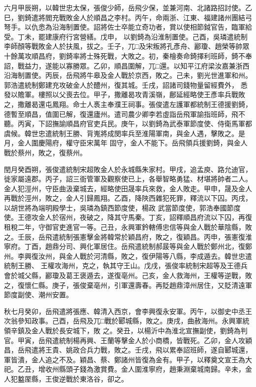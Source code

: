 \begin{pinyinscope}
 六月甲辰朔，以韓世忠太保，張俊少師，岳飛少保，並兼河南、北諸路招討使。乙巳，劉錡遣將閻充戰敗金人於順昌之李村。丙午，命兩浙、江東、福建諸州團結弓弩手。以仇悆為沿海制置使。詔將佐士卒能立奇功者，賞以使相節鉞官告，臨軍給受。丁未，罷建康府行宮營繕。戊申，
 以劉錡為沿淮制置使。己酉，吳璘遣統制李師顏等戰敗金人於扶風，拔之。壬子，兀□及宋叛將孔彥舟、酈瓊、趙榮等帥眾十餘萬攻順昌府，劉錡率將士殊死戰，大敗之。初，秦檜奏命錡擇利班師，錡不奉詔，戰益力，遂能以寡勝眾。乙卯，順昌圍解，兀□還。以知平江府梁汝嘉兼浙西沿海制置使。丙辰，岳飛將牛皋及金人戰於京西，敗之。己未，劉光世進軍和州。郭浩遣統制鄭建充攻破金人於醴州，復其城。壬戌，詔諸司錢物量留經費外，
 悉發以贍軍。樓照以父喪去位。甲子，撒離曷攻青溪嶺，鄜延經略使王彥率兵戰敗之，撒離曷還屯鳳翔。命士人褭主奉濮王祠事。張俊遣左護軍都統制王德援劉錡，德暫至順昌，值圍已解，復還廬州。遣司農少卿李若虛詣岳飛軍諭指班師，飛不聽。丙寅，下詔撫諭順昌府官吏兵民。庚午，以劉錡為武泰軍節度使、侍衛馬軍都虞候。韓世忠遣統制王勝、背嵬將成閔率兵至淮陽軍南，與金人遇，擊敗之。是月，金人圍慶陽府，權守臣宋萬年
 固守，金人不能下。岳飛領兵援劉錡，與金人戰於蔡州，敗之，復蔡州。



 閏月癸酉朔，張俊遣統制宋超敗金人於永城縣朱家村。甲戌，追孟庾、路允迪官，徙家屬遠郡。丙子，詔三衙管軍及觀察使已上，各舉智略勇猛、材堪將帥者二人。金人犯涇州，守臣曲汲棄城去，經略使田晟率兵來救，金人敗走。甲申，晟及金人再戰於涇州，敗之，金人引歸鳳翔。乙酉，降陜西雜犯死罪，釋流以下囚。丙戌，以胡世將為端明殿學士，吳璘為鎮西節度使，楊政
 武當節度使，郭浩奉國節度使。王德攻金人於宿州，夜破之，降其守馬秦。丁亥，詔釋順昌府流以下囚，再復租稅二年，守御官吏進官一等。己丑，永興軍鈐轄傅忠信等與金人戰於華陰縣，敗之。壬辰，岳飛遣統制張憲擊金將韓常於穎昌府，敗之，復穎昌。丙申，張憲復淮寧府。丁酉，趙鼎分司、興化軍居住。岳飛遣統制郝晸等與金人戰於鄭州北，復鄭州。李興復汝州，與金人戰於河清縣，敗之，復伊陽等八縣，李成遁去。韓世忠遣統制王勝、
 王權攻海州，克之，執其守王山。戊戌，張俊率統制宋超等及王德兵會於城父縣，酈瓊及葛王褒遁去，遂復亳州。己亥，金人救海州，王權等逆戰，敗之，復懷仁縣。庚子，張俊棄亳州，引軍還壽春。再貶趙鼎漳州居住，又貶清遠軍節度副使、潮州安置。



 秋七月癸卯，岳飛遣將張應、韓清入西京，會李興復永安軍。丙午，以御史中丞王次翁參知政事。己酉，岳飛及兀□戰於郾城縣，敗之。庚戌，曲赦海州。永興軍統領辛鎮及金人戰於長安城下，敗
 之。癸丑，以楊沂中為淮北宣撫副使，劉錡為判官。甲寅，岳飛遣統制楊再興、王蘭等擊金人於小商橋，皆戰死。乙卯，金人攻穎昌，岳飛遣將王貴、姚政合兵力戰，敗之。壬戌，飛以累奉詔班師，遂自郾城還，軍皆潰，金人追之不及。穎昌、蔡、鄭諸州皆復為金有。甲子，以釋奠文宣王為大祀。乙丑，增收州縣頭子錢為激賞費。金人圍淮寧府，趙秉淵棄城南歸。辛未，金人犯盭厔縣，王俊逆戰於東洛谷，卻之。




\end{pinyinscope}
